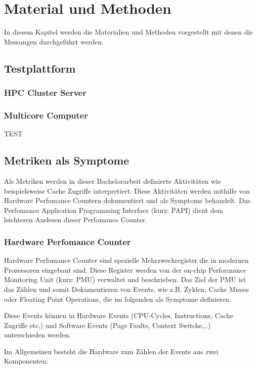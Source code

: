 \chapter{Material und Methoden}

In diesem Kapitel werden die Materialien und Methoden vorgestellt mit denen die Messungen durchgeführt werden.


\section{Testplattform}
\subsection{HPC Cluster Server}
\subsection{Multicore Computer}
TEST

\section{Metriken als Symptome}

Als Metriken werden in dieser Bachelorarbeit definierte Aktivitäten wie beispielsweise Cache Zugriffe interpretiert. Diese Aktivitäten werden mithilfe von Hardware Perfomance Countern dokumentiert und als Symptome behandelt. Das Perfomance Application Programming Interface (kurz: PAPI) dient dem leichteren Auslesen dieser Perfomance Counter.



\subsection{Hardware Perfomance Counter}

Hardware Perfomance Counter sind spezielle Mehrzweckregister die in modernen Prozessoren
eingebaut sind. Diese Register werden von der on-chip Performance Monitoring Unit (kurz:
PMU) verwaltet und beschrieben.
\cite{PMU}
Das Ziel der PMU ist das Zählen und somit Dokumentieren von Events, wie z.B. Zyklen, Cache Misses oder Floating Point Operations, die im folgenden als Symptome definieren.

Diese Events können in Hardware Events (CPU-Cycles, Instructions, Cache Zugriffe etc,) und Software Events (Page Faults, Context Switche,..) unterschieden werden.

Im Allgemeinen besteht die Hardware zum Zählen der Events aus zwei Komponenten: 

